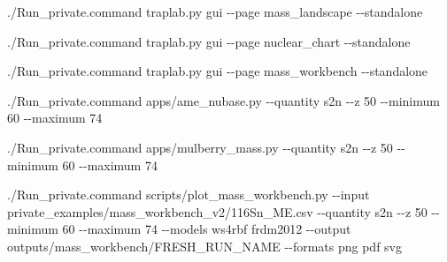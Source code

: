 \documentclass[
  11pt,
  letterpaper,
]{article}
\newenvironment{Shaded}{}{}
\newcommand{\AttributeTok}[1]{\textcolor[rgb]{0.49,0.56,0.16}{#1}}
\newcommand{\ExtensionTok}[1]{#1}
\newcommand{\NormalTok}[1]{#1}
\begin{document}
\begin{Shaded}
\begin{Highlighting}[]
\ExtensionTok{./Run\_private.command}\NormalTok{ traplab.py gui }\AttributeTok{{-}{-}page}\NormalTok{ mass\_landscape }\AttributeTok{{-}{-}standalone}
\end{Highlighting}
\end{Shaded}

\begin{Shaded}
\begin{Highlighting}[]
\ExtensionTok{./Run\_private.command}\NormalTok{ traplab.py gui }\AttributeTok{{-}{-}page}\NormalTok{ nuclear\_chart }\AttributeTok{{-}{-}standalone}
\end{Highlighting}
\end{Shaded}

\begin{Shaded}
\begin{Highlighting}[]
\ExtensionTok{./Run\_private.command}\NormalTok{ traplab.py gui }\AttributeTok{{-}{-}page}\NormalTok{ mass\_workbench }\AttributeTok{{-}{-}standalone}
\end{Highlighting}
\end{Shaded}

\begin{Shaded}
\begin{Highlighting}[]
\ExtensionTok{./Run\_private.command}\NormalTok{ apps/ame\_nubase.py }\AttributeTok{{-}{-}quantity}\NormalTok{ s2n }\AttributeTok{{-}{-}z}\NormalTok{ 50 }\AttributeTok{{-}{-}minimum}\NormalTok{ 60 }\AttributeTok{{-}{-}maximum}\NormalTok{ 74}
\end{Highlighting}
\end{Shaded}

\begin{Shaded}
\begin{Highlighting}[]
\ExtensionTok{./Run\_private.command}\NormalTok{ apps/mulberry\_mass.py }\AttributeTok{{-}{-}quantity}\NormalTok{ s2n }\AttributeTok{{-}{-}z}\NormalTok{ 50 }\AttributeTok{{-}{-}minimum}\NormalTok{ 60 }\AttributeTok{{-}{-}maximum}\NormalTok{ 74}
\end{Highlighting}
\end{Shaded}

\begin{Shaded}
\begin{Highlighting}[]
\ExtensionTok{./Run\_private.command}\NormalTok{ scripts/plot\_mass\_workbench.py }\AttributeTok{{-}{-}input}\NormalTok{ private\_examples/mass\_workbench\_v2/116Sn\_ME.csv }\AttributeTok{{-}{-}quantity}\NormalTok{ s2n }\AttributeTok{{-}{-}z}\NormalTok{ 50 }\AttributeTok{{-}{-}minimum}\NormalTok{ 60 }\AttributeTok{{-}{-}maximum}\NormalTok{ 74 }\AttributeTok{{-}{-}models}\NormalTok{ ws4rbf frdm2012 }\AttributeTok{{-}{-}output}\NormalTok{ outputs/mass\_workbench/FRESH\_RUN\_NAME }\AttributeTok{{-}{-}formats}\NormalTok{ png pdf svg}
\end{Highlighting}
\end{Shaded}
\end{document}
